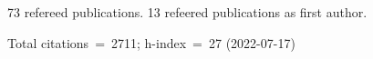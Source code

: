 73 refereed publications. 13 refeered publications as first author.

Total citations~=~2711; h-index~=~27 (2022-07-17)